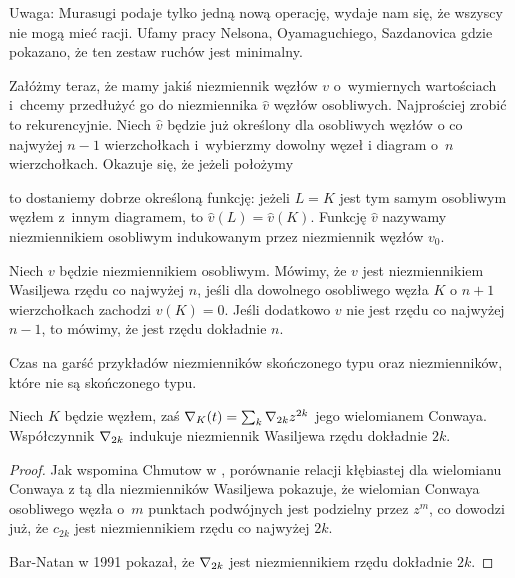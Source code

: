 Uwaga: Murasugi podaje tylko jedną nową operację, wydaje nam się, że wszyscy nie mogą mieć racji.
Ufamy pracy Nelsona, Oyamaguchiego, Sazdanovica \cite{sazdanovic19} gdzie pokazano, że ten zestaw ruchów jest minimalny.

Załóżmy teraz, że mamy jakiś niezmiennik węzłów $v$ o~wymiernych wartościach i~chcemy przedłużyć go do niezmiennika $\hat v$ węzłów osobliwych.
Najprościej zrobić to rekurencyjnie.
Niech $\hat v$ będzie już określony dla osobliwych węzłów o co najwyżej $n - 1$ wierzchołkach i~wybierzmy dowolny węzeł i diagram o~$n$ wierzchołkach.
Okazuje się, że jeżeli położymy

to dostaniemy dobrze określoną funkcję: jeżeli $L = K$ jest tym samym osobliwym węzłem z~innym diagramem, to $\hat v(L) = \hat v(K)$.
Funkcję $\hat v$ nazywamy niezmiennikiem osobliwym indukowanym przez niezmiennik węzłów $v_0$.

\begin{definition}
\label{def:vassiliev_order}%
%
    Niech $v$ będzie niezmiennikiem osobliwym.
    Mówimy, że $v$ jest niezmiennikiem Wasiljewa rzędu co najwyżej $n$, jeśli dla dowolnego osobliwego węzła $K$ o $n + 1$ wierzchołkach zachodzi $v(K) = 0$.
    Jeśli dodatkowo $v$ nie jest rzędu co najwyżej $n - 1$, to mówimy, że jest rzędu dokładnie $n$.
\end{definition}

Czas na garść przykładów niezmienników skończonego typu oraz niezmienników, które nie są skończonego typu.

\begin{example}
%
    Niech $K$ będzie węzłem, zaś $\nabla_K(t) = \sum_k \nabla_{2k} z^{2k}$ jego wielomianem Conwaya.
    Współczynnik $\nabla_{2k}$ indukuje niezmiennik Wasiljewa rzędu dokładnie $2k$.
\end{example}

\begin{proof}
    Jak wspomina Chmutow w \cite{chmutov12}, porównanie relacji kłębiastej dla wielomianu Conwaya z tą dla niezmienników Wasiljewa pokazuje, że wielomian Conwaya osobliwego węzła o~$m$ punktach podwójnych jest podzielny przez $z^m$, co dowodzi już, że $c_{2k}$ jest niezmiennikiem rzędu co najwyżej $2k$.

    Bar-Natan w 1991 pokazał, że $\nabla_{2k}$ jest niezmiennikiem rzędu dokładnie $2k$.
\end{proof}

